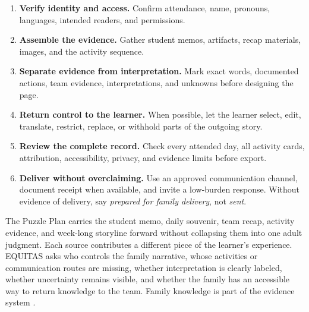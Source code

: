\begin{enumerate}
  \item \textbf{Verify identity and access.} Confirm attendance, name, pronouns, languages, intended readers, and permissions.
  \item \textbf{Assemble the evidence.} Gather student memos, artifacts, recap materials, images, and the activity sequence.
  \item \textbf{Separate evidence from interpretation.} Mark exact words, documented actions, team evidence, interpretations, and unknowns before designing the page.
  \item \textbf{Return control to the learner.} When possible, let the learner select, edit, translate, restrict, replace, or withhold parts of the outgoing story.
  \item \textbf{Review the complete record.} Check every attended day, all activity cards, attribution, accessibility, privacy, and evidence limits before export.
  \item \textbf{Deliver without overclaiming.} Use an approved communication channel, document receipt when available, and invite a low-burden response. Without evidence of delivery, say \textit{prepared for family delivery}, not \textit{sent}.
\end{enumerate}


The Puzzle Plan carries the student memo, daily souvenir, team recap, activity evidence, and week-long storyline forward without collapsing them into one adult judgment. Each source contributes a different piece of the learner's experience. EQUITAS asks who controls the family narrative, whose activities or communication routes are missing, whether interpretation is clearly labeled, whether uncertainty remains visible, and whether the family has an accessible way to return knowledge to the team. Family knowledge is part of the evidence system \citep{zacarian2015community}.




\normalsize